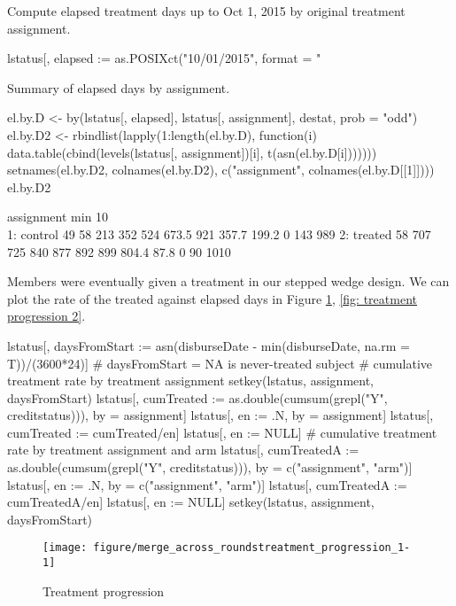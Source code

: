 	Compute elapsed treatment days up to Oct 1, 2015 by original treatment assignment. 
\begin{Schunk}
\begin{Sinput}
lstatus[, elapsed := as.POSIXct("10/01/2015", format = "%m/%d/%Y") - disburseDate]
\end{Sinput}
\end{Schunk}
Summary of elapsed days by \textsf{assignment}.
\begin{Schunk}
\begin{Sinput}
el.by.D <- by(lstatus[, elapsed], lstatus[, assignment], destat, prob = "odd")
el.by.D2 <- rbindlist(lapply(1:length(el.by.D), 
	function(i) data.table(cbind(levels(lstatus[, assignment])[i], t(asn(el.by.D[i]))))))
setnames(el.by.D2, colnames(el.by.D2), c("assignment", colnames(el.by.D[[1]])))
el.by.D2
\end{Sinput}
\begin{Soutput}
   assignment min 10\\% 25\\% median 75\\% 90\\% max  mean   std 0s NAs    n
1:    control  49    58   213    352   524 673.5 921 357.7 199.2  0 143  989
2:    treated  58   707   725    840   877   892 899 804.4  87.8  0  90 1010
\end{Soutput}
\end{Schunk}
Members were eventually given a treatment in our stepped wedge design. We can plot the rate of the treated against elapsed days in \textsf{Figure \ref{fig: treatment progression 1}, \ref{fig: treatment progression 2}}.
\begin{Schunk}
\begin{Sinput}
lstatus[, daysFromStart := 
	asn(disburseDate - min(disburseDate, na.rm = T))/(3600*24)]
# daysFromStart = NA is never-treated subject
#  cumulative treatment rate by treatment assignment
setkey(lstatus, assignment, daysFromStart)
lstatus[, cumTreated := as.double(cumsum(grepl("Y", creditstatus))), by = assignment]
lstatus[, en := .N, by = assignment]
lstatus[, cumTreated := cumTreated/en]
lstatus[, en := NULL]
#  cumulative treatment rate by treatment assignment and arm
lstatus[, cumTreatedA := as.double(cumsum(grepl("Y", creditstatus))), 
	by = c("assignment", "arm")]
lstatus[, en := .N, by = c("assignment", "arm")]
lstatus[, cumTreatedA := cumTreatedA/en]
lstatus[, en := NULL]
setkey(lstatus, assignment, daysFromStart)
\end{Sinput}
\end{Schunk}
\begin{Schunk}
\begin{figure}

{\centering \texttt{[image: figure/merge\_across\_roundstreatment\_progression\_1-1]} 

}

\caption[Treatment progression]{Treatment progression}\label{fig: treatment progression 1}
\end{figure}
\end{Schunk}

